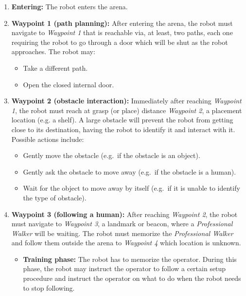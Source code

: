 \begin{enumerate}
	\item \textbf{Entering:} The robot enters the arena.

	\item \textbf{Waypoint 1 (path planning):} After entering the arena, the robot must navigate to \textit{Waypoint 1} that is reachable via, at least, two paths, each one requiring the robot to go through a door which will be shut as the robot approaches. The robot may:
	\begin{itemize}
		\item Take a different path.
		\item Open the closed internal door.
	\end{itemize}

	\item \textbf{Waypoint 2 (obstacle interaction):} Immediately after reaching \textit{Waypoint 1}, the robot must reach at grasp (or place) distance \textit{Waypoint 2}, a placement location (e.g. a shelf). A large obstacle will prevent the robot from getting close to its destination, having the robot to identify it and interact with it.
	Possible actions include:
	\begin{itemize}
		\item Gently move the obstacle (e.g.~if the obstacle is an object).
		\item Gently ask the obstacle to move away (e.g.~if the obstacle is a human).
		\item Wait for the object to move away by itself (e.g.~if it is unable to identify the type of obstacle).
	\end{itemize}

	\item \textbf{Waypoint 3 (following a human):} After reaching \textit{Waypoint 2}, the robot must navigate to \textit{Waypoint 3}, a landmark or beacon, where a \textit{Professional Walker} will be waiting. The robot must memorize the \textit{Professional Walker} and follow them outside the arena to \textit{Waypoint 4} which location is unknown.
	\begin{itemize}
		\item \textbf{Training phase:} The robot has to memorize the operator. During this phase, the robot may instruct the operator to follow a certain setup procedure and instruct the operator on what to do when the robot needs to stop following.
		

\end{itemize}
\end{enumerate}
